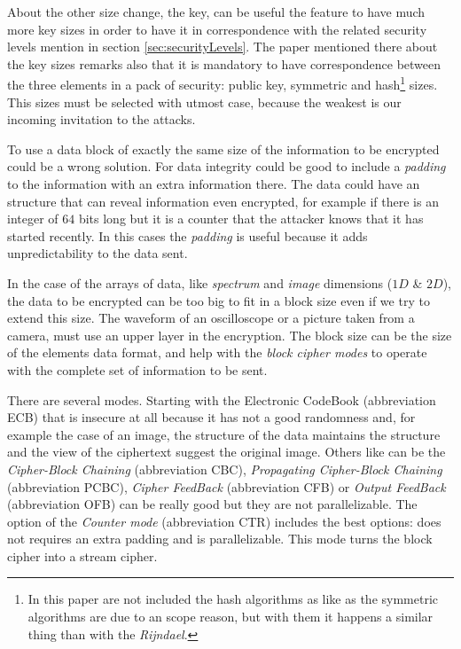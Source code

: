 \documentclass[10pt,a4paper,twoside]{llncs}
\newcommand{\todo}[1]{\texttt{\color{red}TODO:} ``\emph{#1}''}
\begin{document}
About the other size change, the key, can be useful the feature to have much more key sizes in order to have it in correspondence with the related security levels mention in section \ref{sec:securityLevels}. The paper mentioned there \cite{lenstrauniversal13} about the key sizes remarks also that it is mandatory to have correspondence between the three elements in a pack of security: public key, symmetric and hash\footnote{In this paper are not included the hash algorithms as like as the symmetric algorithms are due to an scope reason, but with them it happens a similar thing than with the \emph{Rijndael}.} sizes. This sizes must be selected with utmost case, because the weakest is our incoming invitation to the attacks.


To use a data block of exactly the same size of the information to be encrypted could be a wrong solution. For data integrity could be good to include a \emph{padding} to the information with an extra information there. The data could have an structure that can reveal information even encrypted, for example if there is an integer of $64$ bits long but it is a counter that the attacker knows that it has started recently. In this cases the \emph{padding} is useful because it adds unpredictability to the data sent.

In the case of the arrays of data, like \emph{spectrum} and \emph{image} dimensions ($1D$ \& $2D$), the data to be encrypted can be too big to fit in a block size even if we try to extend this size. The waveform of an oscilloscope or a picture taken from a camera, must use an upper layer in the encryption. The block size can be the size of the elements data format, and help with the \emph{block cipher modes} to operate with the complete set of information to be sent.

There are several modes. Starting with the Electronic CodeBook (abbreviation ECB) that is insecure at all because it has not a good randomness and, for example the case of an image, the structure of the data maintains the structure and the view of the ciphertext suggest the original image. Others like can be the \emph{Cipher-Block Chaining} (abbreviation CBC), \emph{Propagating Cipher-Block Chaining} (abbreviation PCBC), \emph{Cipher FeedBack} (abbreviation CFB) or \emph{Output FeedBack} (abbreviation OFB) can be really good but they are not parallelizable. The option of the \emph{Counter mode} (abbreviation CTR) includes the best options: does not requires an extra padding and is parallelizable. This mode turns the block cipher into a stream cipher.
\end{document}
